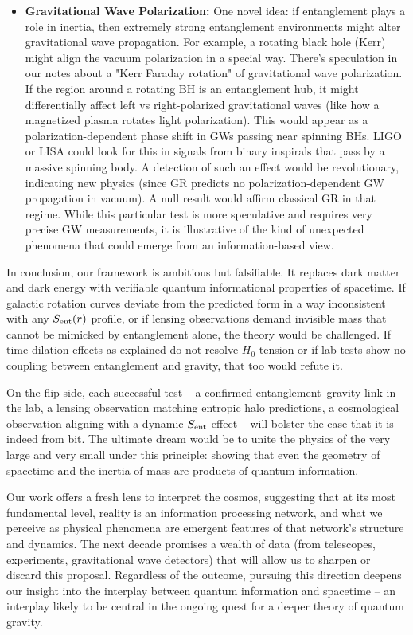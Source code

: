 \documentclass[11pt]{article}
\begin{document}
\begin{itemize}
    \item \textbf{Gravitational Wave Polarization:} One novel idea: if entanglement plays a role in inertia, then extremely strong entanglement environments might alter gravitational wave propagation. For example, a rotating black hole (Kerr) might align the vacuum polarization in a special way. There’s speculation in our notes about a "Kerr Faraday rotation" of gravitational wave polarization​. If the region around a rotating BH is an entanglement hub, it might differentially affect left vs right-polarized gravitational waves (like how a magnetized plasma rotates light polarization). This would appear as a polarization-dependent phase shift in GWs passing near spinning BHs​. LIGO or LISA could look for this in signals from binary inspirals that pass by a massive spinning body. A detection of such an effect would be revolutionary, indicating new physics (since GR predicts no polarization-dependent GW propagation in vacuum). A null result would affirm classical GR in that regime​. While this particular test is more speculative and requires very precise GW measurements, it is illustrative of the kind of unexpected phenomena that could emerge from an information-based view.
\end{itemize}

In conclusion, our framework is ambitious but falsifiable. It replaces dark matter and dark energy with verifiable quantum informational properties of spacetime. If galactic rotation curves deviate from the predicted form in a way inconsistent with any $S_{\rm ent}(r)$ profile, or if lensing observations demand invisible mass that cannot be mimicked by entanglement alone, the theory would be challenged​. If time dilation effects as explained do not resolve $H_0$ tension or if lab tests show no coupling between entanglement and gravity, that too would refute it.

On the flip side, each successful test – a confirmed entanglement–gravity link in the lab, a lensing observation matching entropic halo predictions, a cosmological observation aligning with a dynamic $S_{\rm ent}$ effect – will bolster the case that it is indeed from bit. The ultimate dream would be to unite the physics of the very large and very small under this principle: showing that even the geometry of spacetime and the inertia of mass are products of quantum information.

Our work offers a fresh lens to interpret the cosmos, suggesting that at its most fundamental level, reality is an information processing network, and what we perceive as physical phenomena are emergent features of that network’s structure and dynamics. The next decade promises a wealth of data (from telescopes, experiments, gravitational wave detectors) that will allow us to sharpen or discard this proposal. Regardless of the outcome, pursuing this direction deepens our insight into the interplay between quantum information and spacetime – an interplay likely to be central in the ongoing quest for a deeper theory of quantum gravity.
\end{document}

